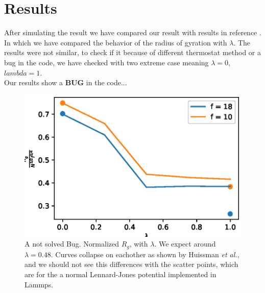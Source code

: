 \section{Results}
After simulating the result we have compared our result with results in reference \cite{Huissmann2009}. In which we have compared the behavior of the radius of gyration with $\lambda$.
The results were not similar, to check if it because of different thermostat method or a bug in the code, we have checked with two extreme case meaning $\lambda = 0$, $lambda = 1$.
\\
Our results show a \textbf{BUG} in the code...
\begin{figure}
    \centering
    \includegraphics{figures/test_failed.eps}
    \caption{A not solved Bug. Normalized $R_g$, with $\lambda$. We expect around $\lambda = 0.48$. Curves collapse on eachother as shown by Huissman \textit{et al.}, and we should not see this differences with the scatter points, which are for the a normal Lennard-Jones potential implemented in Lammps.}
    \label{fig:enter-label}
\end{figure}